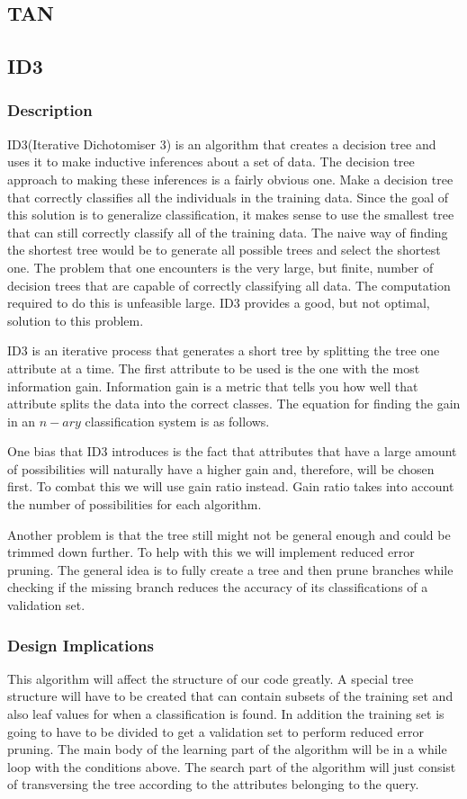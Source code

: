 \documentclass{article}
\begin{document}
		\subsection{TAN}
		\subsection{ID3}
		\subsubsection{Description}
		ID3(Iterative Dichotomiser 3) is an algorithm that creates a decision tree and uses it to make inductive inferences about a set of data.
		 The decision tree approach to making these inferences is a fairly obvious one.
		  Make a decision tree that correctly classifies all the individuals in the training data.
		   Since the goal of this solution is to generalize classification, it makes sense to use the smallest tree that can still correctly classify all of the training data.
		    The naive way of finding the shortest tree would be to generate all possible trees and select the shortest one\cite{Quinlan1986}.
		     The problem that one encounters is the very large, but finite, number of decision trees that are capable of correctly classifying all data.
		      The computation required to do this is unfeasible large.
		       ID3 provides a good, but not optimal, solution to this problem.
		
		ID3 is an iterative process that generates a short tree by splitting the tree one attribute at a time. The first attribute to be used is the one with the most information gain. Information gain is  a metric that tells you how well that attribute splits the data into the correct classes. The equation for finding the gain in an $n-ary$ classification system is as follows.
	
		One bias that ID3 introduces is the fact that attributes that have a large amount of possibilities will naturally have a higher gain and, therefore, will be chosen first. To combat this we will use gain ratio instead. Gain ratio takes into account the number of possibilities for each algorithm.
		
		Another problem is that the tree still might not be general enough and could be trimmed down further. To help with this we will implement reduced error pruning. The general idea is to fully create a tree and then prune branches while checking if the missing branch reduces the accuracy of its classifications of a validation set.
		\subsubsection{Design Implications}
		This algorithm will affect the structure of our code greatly. A special tree structure will have to be created that can contain subsets of the training set and also leaf values for when a classification is found. In addition the training set is going to have to be divided to get a validation set to perform reduced error pruning. The main body of the learning part of the algorithm will be in a while loop with the conditions above. The search part of the algorithm will just consist of transversing the tree according to the attributes belonging to the query.
		
\end{document}
